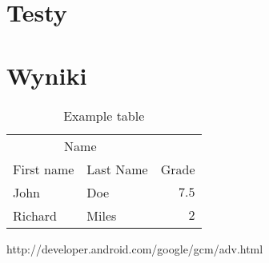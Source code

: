 \documentclass[twoside]{article}
\begin{document}
\begin{multicols}{2}
\section{Testy}

\section{Wyniki}
\begin{table}[H]
\caption{Example table}
\centering
\begin{tabular}{llr}
\toprule
\multicolumn{2}{c}{Name} \\
\cmidrule(r){1-2}
First name & Last Name & Grade \\
\midrule
John & Doe & $7.5$ \\
Richard & Miles & $2$ \\
\bottomrule
\end{tabular}
\end{table}


\begin{thebibliography}{99} %

http://developer.android.com/google/gcm/adv.html
 
\end{thebibliography}


\end{multicols}
\end{document}
